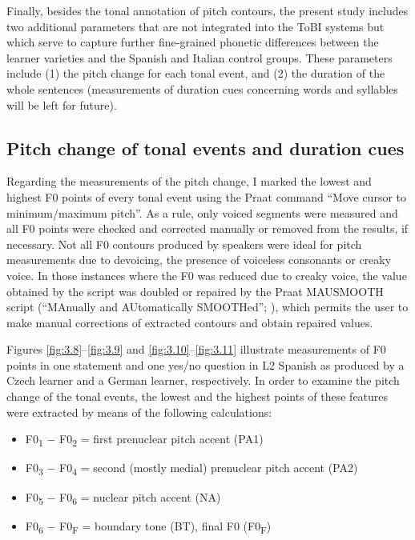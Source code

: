 Finally, besides the tonal annotation of pitch contours, the present study includes two additional parameters that are not integrated into the ToBI systems but which serve to capture further fine-grained phonetic differences between the learner varieties and the Spanish and Italian control groups. These parameters include (1) the pitch change for each tonal event, and (2) the duration of the whole sentences (measurements of duration cues concerning words and syllables will be left for future).


\subsection{Pitch change of tonal events and duration cues}\label{sec:3.4.2}

\begin{sloppypar}
Regarding the measurements of the pitch change, I marked the lowest and highest F0 points of every tonal event using the Praat command “Move cursor to minimum/maximum pitch”. As a rule, only voiced segments were measured and all F0 points were checked and corrected manually or removed from the results, if necessary. Not all F0 contours produced by speakers were ideal for pitch measurements due to devoicing, the presence of voiceless consonants or creaky voice. In those instances where the F0 was reduced due to creaky voice, the value obtained by the script was doubled \citep{ArvanitiEtAl2017} or repaired by the Praat MAUSMOOTH script (“MAnually and AUtomatically SMOOTHed”; \citealt{Cangemi2015}), which permits the user to make manual corrections of extracted contours and obtain repaired values.
\end{sloppypar}


Figures \ref{fig:3.8}--\ref{fig:3.9} and \ref{fig:3.10}--\ref{fig:3.11} illustrate measurements of F0 points in one statement and one yes/no question in L2 Spanish as produced by a Czech learner and a German learner, respectively. In order to examine the pitch change of the tonal events, the lowest and the highest points of these features were extracted by means of the following calculations:\pagebreak


\begin{itemize}
\item F0\textsubscript{1} $-$ F0\textsubscript{2} = first prenuclear pitch accent (PA1)
\item F0\textsubscript{3} $-$ F0\textsubscript{4} = second (mostly medial) prenuclear pitch accent (PA2)
\item F0\textsubscript{5} $-$ F0\textsubscript{6} = nuclear pitch accent (NA)
\item F0\textsubscript{6} $-$ F0\textsubscript{F} = boundary tone (BT), final F0 (F0\textsubscript{F})
\end{itemize}


